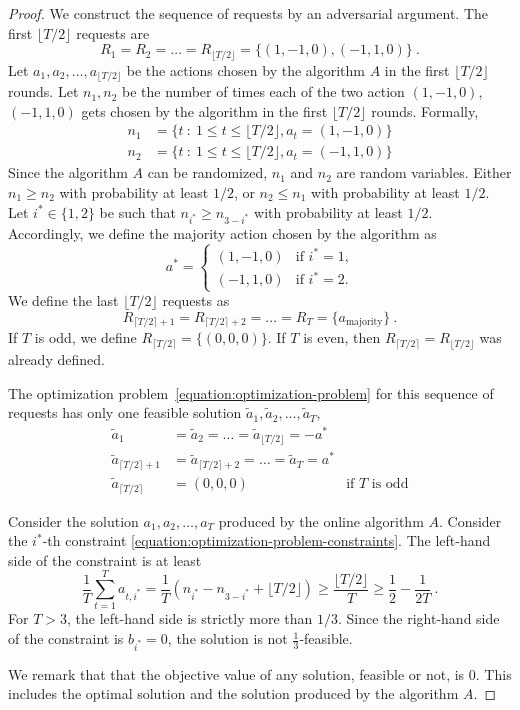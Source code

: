 \documentclass[12pt]{article}
\theoremstyle{definition}
\begin{document}
\begin{proof}
We construct the sequence of requests by an adversarial argument. The first
$\lfloor T/2 \rfloor$ requests are
$$
R_1 = R_2 = \dots = R_{\lfloor T/2 \rfloor} = \{ (1,-1,0), (-1,1,0) \} \: .
$$
Let $a_1, a_2, \dots, a_{\lfloor T/2 \rfloor}$ be the actions chosen by the
algorithm $A$ in the first $\lfloor T/2 \rfloor$ rounds. Let $n_1, n_2$ be
the number of times each of the two action $(1,-1,0)$, $(-1,1,0)$ gets chosen by
the algorithm in the first $\lfloor T/2 \rfloor$ rounds. Formally,
\begin{align*}
n_1 & = \{ t ~:~ 1 \le t \le \lfloor T/2 \rfloor, a_t = (1,-1,0) \} \\
n_2 & = \{ t ~:~ 1 \le t \le \lfloor T/2 \rfloor, a_t = (-1,1,0) \}
\end{align*}
Since the algorithm $A$ can be randomized, $n_1$ and $n_2$ are random variables.
Either $n_1 \ge n_2$ with probability at least $1/2$, or $n_2 \le n_1$ with
probability at least $1/2$. Let $i^* \in \{1,2\}$ be such that $n_{i^*} \ge n_{3 - i^*}$
with probability at least $1/2$. Accordingly, we define the majority action
chosen by the algorithm as
$$
a^* =
\begin{cases}
(1,-1,0) & \text{if $i^*=1$,} \\
(-1,1,0) & \text{if $i^*=2$.}
\end{cases}
$$
We define the last $\lfloor T/2 \rfloor$ requests as
$$
R_{\lceil T/2 \rceil + 1} = R_{\lceil T/2 \rceil + 2} = \dots = R_T = \{ a_{\text{majority}} \} \: .
$$
If $T$ is odd, we define $R_{\lceil T/2 \rceil} = \{ (0, 0, 0)\}$. If $T$ is even, then
$R_{\lceil T/2 \rceil} = R_{\lfloor T/2 \rfloor}$ was already defined.

The optimization problem~\eqref{equation:optimization-problem} for this sequence
of requests has only one feasible solution $\tilde{a}_1, \tilde{a}_2, \dots,
\tilde{a}_T$,
\begin{align*}
\tilde{a}_1 & = \tilde{a}_2 = \dots = \tilde{a}_{\lfloor T/2 \rfloor} = - a^* \\
\tilde{a}_{\lceil T/2 \rceil + 1} & = \tilde{a}_{\lceil T/2 \rceil + 2} = \dots = \tilde{a}_T = a^* \\
\tilde{a}_{\lceil T/2 \rceil} & = (0, 0, 0) & \text{if $T$ is odd}
\end{align*}

Consider the solution $a_1, a_2, \dots, a_T$ produced by the online algorithm
$A$. Consider the $i^*$-th constraint
\eqref{equation:optimization-problem-constraints}. The left-hand side of the
constraint is at least
$$
\frac{1}{T} \sum_{t=1}^T a_{t,i^*} = \frac{1}{T} \left( n_{i^*} - n_{3 - i^*} + \lfloor T/2 \rfloor \right) \ge \frac{\lfloor T/2 \rfloor}{T} \ge \frac{1}{2} - \frac{1}{2T} \: .
$$
For $T > 3$, the left-hand side is strictly more than $1/3$. Since the
right-hand side of the constraint is $b_{i^*} = 0$, the solution is not
$\frac{1}{3}$-feasible.

We remark that that the objective value of any solution, feasible or not, is $0$.
This includes the optimal solution and the solution produced by the algorithm $A$.
\end{proof}
\end{document}
